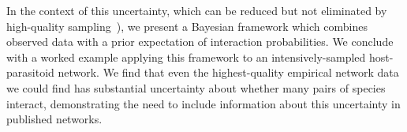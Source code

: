 \documentclass[12pt]{article}
\begin{document}
\begin{spacing}{2.0}
    In the context of this uncertainty, which can be reduced but not eliminated by high-quality sampling~\citep{Bartomeus2013}), we present a Bayesian framework which combines observed data with a prior expectation of interaction probabilities. We conclude with a worked example applying this framework to an intensively-sampled host-parasitoid network. We find that even the highest-quality empirical network data we could find has substantial uncertainty about whether many pairs of species interact, demonstrating the need to include information about this uncertainty in published networks. 







\end{spacing}
\end{document}
